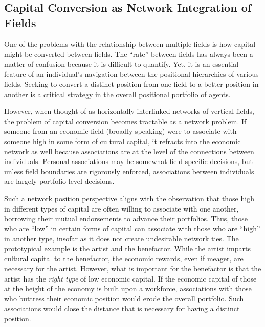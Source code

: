 \documentclass[12pt]{article}
\begin{document}

\subsection{Capital Conversion as Network Integration of Fields}
One of the problems with the relationship between multiple fields is how capital might be converted between fields. The ``rate'' between fields has always been a matter of confusion because it is difficult to quantify. Yet, it is an essential feature of an individual's navigation between the positional hierarchies of various fields. Seeking to convert a distinct position from one field to a better position in another is a critical strategy in the overall positional portfolio of agents.

However, when thought of as horizontally interlinked networks of vertical fields, the problem of capital conversion becomes tractable as a network problem. If someone from an economic field (broadly speaking) were to associate with someone high in some form of cultural capital, it refracts into the economic network as well because associations are at the level of the connections between individuals. Personal associations may be somewhat field-specific decisions, but unless field boundaries are rigorously enforced, associations between individuals are largely portfolio-level decisions. 

Such a network position perspective aligns with the observation that those high in different types of capital are often willing to associate with one another, borrowing their mutual endorsements to advance their portfolios. Thus, those who are ``low'' in certain forms of capital can associate with those who are ``high'' in another type, insofar as it does not create undesirable network ties. The prototypical example is the artist and the benefactor. While the artist imparts cultural capital to the benefactor, the economic rewards, even if meager, are necessary for the artist. However, what is important for the benefactor is that the artist has the \textit{right type} of low economic capital. If the economic capital of those at the height of the economy is built upon a workforce, associations with those who buttress their economic position would erode the overall portfolio. Such associations would close the distance that is necessary for having a distinct position. 
\end{document}
